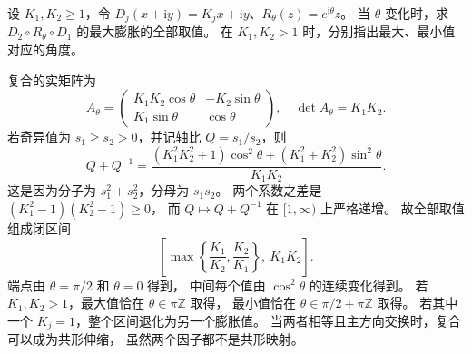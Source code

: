 \begin{exercise}\label{b3:ex:B-2}
设 \(K_1,K_2\ge1\)，令
\(D_j(x+\mathrm i y)=K_jx+\mathrm i y\)、\(R_\theta(z)=e^{\mathrm i\theta}z\)。
当 \(\theta\) 变化时，求 \(D_2\circ R_\theta\circ D_1\) 的最大膨胀的全部取值。
在 \(K_1,K_2>1\) 时，分别指出最大、最小值对应的角度。
\end{exercise}
\begin{solution}
复合的实矩阵为
\[
 A_\theta=
 \begin{pmatrix}
 K_1K_2\cos\theta&-K_2\sin\theta\\
 K_1\sin\theta&\cos\theta
 \end{pmatrix},\quad \det A_\theta=K_1K_2.
\]
若奇异值为 \(s_1\ge s_2>0\)，并记轴比 \(Q=s_1/s_2\)，则
\[
 Q+Q^{-1}
 =\frac{(K_1^2K_2^2+1)\cos^2\theta
                 +(K_1^2+K_2^2)\sin^2\theta}{K_1K_2}.
\]
这是因为分子为 \(s_1^2+s_2^2\)，分母为 \(s_1s_2\)。
两个系数之差是 \((K_1^2-1)(K_2^2-1)\ge0\)，
而 \(Q\mapsto Q+Q^{-1}\) 在 \([1,\infty)\) 上严格递增。
故全部取值组成闭区间
\[
 \left[\max\left\{\frac{K_1}{K_2},\frac{K_2}{K_1}\right\},\ K_1K_2\right].
\]
端点由 \(\theta=\pi/2\) 和 \(\theta=0\) 得到，
中间每个值由 \(\cos^2\theta\) 的连续变化得到。
若 \(K_1,K_2>1\)，最大值恰在 \(\theta\in\pi\mathbb Z\) 取得，
最小值恰在 \(\theta\in\pi/2+\pi\mathbb Z\) 取得。
若其中一个 \(K_j=1\)，整个区间退化为另一个膨胀值。
当两者相等且主方向交换时，复合可以成为共形伸缩，
虽然两个因子都不是共形映射。
\end{solution}

